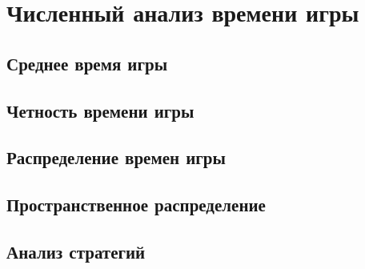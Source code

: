 \chapter{Численный анализ времени игры}\label{ch:ch3}

\section{Среднее время игры}\label{sec:ch3/sec1}

\section{Четность времени игры}\label{sec:ch3/sec2}

\section{Распределение времен игры}\label{sec:ch3/sec3}

\section{Пространственное распределение}\label{sec:ch3/sec4}

\section{Анализ стратегий}\label{sec:ch3/sec5}


